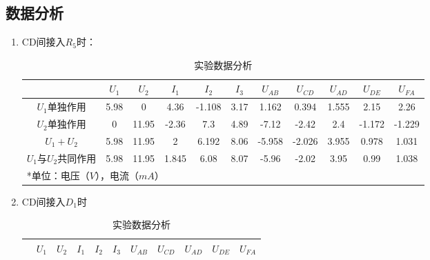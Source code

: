 \documentclass{../source/Experiment}
\begin{document}
        \subsection{数据分析}
            \begin{enumerate}
                \item CD间接入$R_5$时：
                \begin{table}[htbp]
                    \begin{center}
                        \caption{实验数据分析}
                        \begin{tabular}{|c|c|c|c|c|c|c|c|c|c|c|}
                            \hline    
                                {}{}& $U_1$ & $U_2$ & $I_1$ & $I_2$  & $I_3$ & $U_{AB}$ & $U_{CD}$ & $U_{AD}$ & $U_{DE}$ & $U_{FA}$ \\ \hline
                            $U_1$单独作用       & 5.98  & 0     & 4.36  & -1.108 & 3.17  & 1.162    & 0.394    & 1.555    & 2.15     & 2.26     \\ \hline
                            $U_2$单独作用       & 0     & 11.95 & -2.36 & 7.3    & 4.89  & -7.12    & -2.42    & 2.4      & -1.172   & -1.229   \\ \hline
                            $U_1 + U_2$     & 5.98  & 11.95 & 2     & 6.192  & 8.06  & -5.958   & -2.026   & 3.955    & 0.978    & 1.031    \\ \hline
                            $U_1$与$U_2$共同作用 & 5.98  & 11.95 & 1.845 & 6.08   & 8.07  & -5.96    & -2.02    & 3.95     & 0.99     & 1.038    \\ \hline
                            \multicolumn{11}{l}{*单位：电压（$V$），电流（$mA$）}                                                                      
                            \end{tabular}
                    \end{center}
                \end{table}
                \item CD间接入$D_1$时
                \newpage
                \begin{table}[htbp]
                    \begin{center}
                        \caption{实验数据分析}
                        \begin{tabular}{|c|c|c|c|c|c|c|c|c|c|c|}
                            \hline
                                & $U_1$ & $U_2$ & $I_1$ & $I_2$ & $I_3$ & $U_{AB}$ & $U_{CD}$ & $U_{AD}$ & $U_{DE}$ & $U_{FA}$ \\ \hline

\end{tabular}
\end{center}
\end{table}
\end{enumerate}
\end{document}
